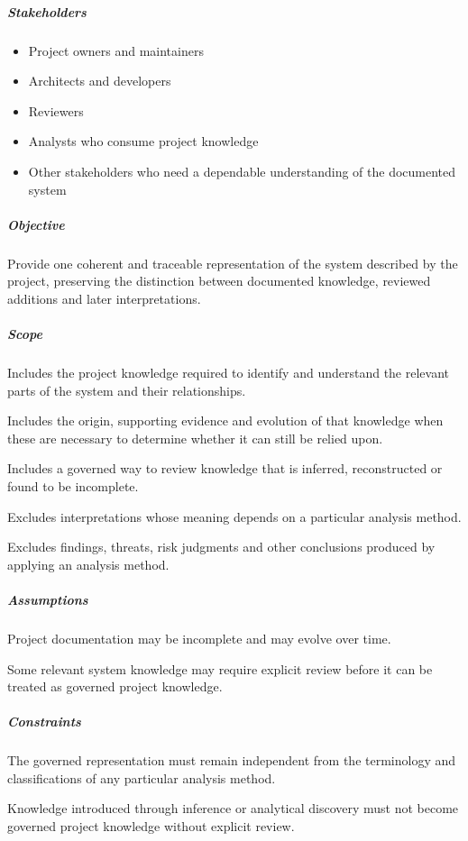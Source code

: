 \documentclass[
  10pt,
]{article}
\providecommand{\tightlist}{%
  \setlength{\itemsep}{0pt}\setlength{\parskip}{0pt}}
\begin{document}
\subparagraph{Stakeholders}\label{stakeholders-3}

\begin{itemize}
\tightlist
\item
  Project owners and maintainers
\item
  Architects and developers
\item
  Reviewers
\item
  Analysts who consume project knowledge
\item
  Other stakeholders who need a dependable understanding of the
  documented system
\end{itemize}

\subparagraph{Objective}\label{objective-3}

Provide one coherent and traceable representation of the system
described by the project, preserving the distinction between documented
knowledge, reviewed additions and later interpretations.

\subparagraph{Scope}\label{scope-3}

Includes the project knowledge required to identify and understand the
relevant parts of the system and their relationships.

Includes the origin, supporting evidence and evolution of that knowledge
when these are necessary to determine whether it can still be relied
upon.

Includes a governed way to review knowledge that is inferred,
reconstructed or found to be incomplete.

Excludes interpretations whose meaning depends on a particular analysis
method.

Excludes findings, threats, risk judgments and other conclusions
produced by applying an analysis method.

\subparagraph{Assumptions}\label{assumptions}

Project documentation may be incomplete and may evolve over time.

Some relevant system knowledge may require explicit review before it can
be treated as governed project knowledge.

\subparagraph{Constraints}\label{constraints}

The governed representation must remain independent from the terminology
and classifications of any particular analysis method.

Knowledge introduced through inference or analytical discovery must not
become governed project knowledge without explicit review.
\end{document}

